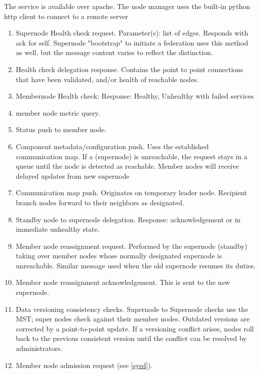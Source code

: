 \documentclass[oneside,12pt]{memoir}
\begin{document}
The service is available over apache. The node manager uses the built-in python http client to connect to a remote server

\begin{enumerate}
\item
Supernode Health check request.  Parameter(s): list of edges.  Responds with ack for self.  Supernode "bootstrap" to initiate a federation uses this method as well, but the message content varies to reflect the distinction. 

\item
Health check delegation response.  Contains the point to point connections that have been validated, and/or health of reachable nodes.

\item
Membernode Health check:  Response: Healthy, Unhealthy with failed services
\item
member node metric query.
\item
Status push to member node.
\item
Component metadata/configuration push.  Uses the established communication map.  If a (supernode) is unreachable, the request stays in a queue until the node is detected as reachable.  Member nodes will receive delayed updates from new supernode
\item
Communication map push.  Originates on temporary leader node.  Recipient branch nodes forward to their neighbors as designated.
\item
Standby node to supernode delegation.  Response: acknowledgement or in immediate unhealthy state.
\item
Member node reassignment request.  Performed by the supernode (standby) taking over member nodes whose normally designated supernode is unreachable.   Similar message used when the old supernode resumes its duties.
\item
Member node reassignment acknowledgement.  This is sent to the new supernode.
\item
Data versioning consistency checks.  Supernode to Supernode checks use the MST; super nodes check against their member nodes. Outdated versions are corrected by a point-to-point update.  If a versioning conflict arises, nodes roll back to the previous consistent version until the conflict can be resolved by administrators.  
\item
Member node admission request (see \ref{sysd}).   


\end{enumerate}
\end{document}
